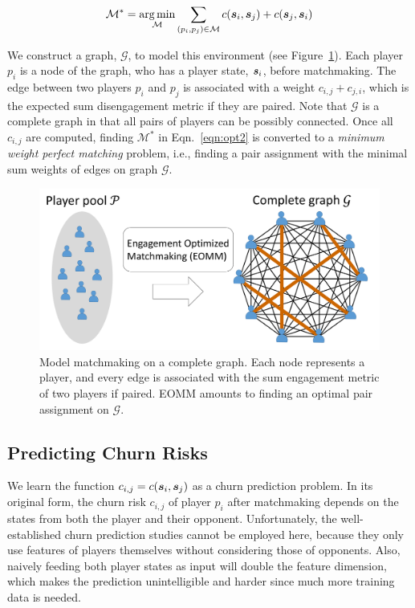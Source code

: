 \begin{align}
\mathcal{M}^* = \operatorname*{arg\,min}_{\mathcal{M}} \sum\limits_{(p_i, p_j)\in \mathcal{M}} c(\boldsymbol{s}_i, \boldsymbol{s}_j) + c(\boldsymbol{s}_j, \boldsymbol{s}_i) \label{eqn:opt2}
\end{align}


We construct a graph, $\mathcal{G}$, to model this environment (see Figure~\ref{fig:matching}). Each player $p_i$ is a node of the graph, who has a player state, $\boldsymbol{s}_i$, before matchmaking. The edge between two players $p_i$ and $p_j$ is associated with a weight $c_{i,j} + c_{j,i}$, which is the expected sum disengagement metric if they are paired. Note that $\mathcal{G}$ is a complete graph in that all pairs of players can be possibly connected. Once all $c_{i,j}$ are computed, finding $\mathcal{M}^*$ in Eqn.~\ref{eqn:opt2} is converted to a \emph{minimum weight perfect matching} problem, i.e., finding a pair assignment with the minimal sum weights of edges on graph $\mathcal{G}$.

\begin{figure}[tb]
\centering
\includegraphics[width=1\textwidth]{Figures/complete_matching.pdf}
\caption{Model matchmaking on a complete graph. Each node represents a player, and every edge is associated with the sum engagement metric of two players if paired. EOMM amounts to finding an optimal pair assignment on $\mathcal{G}$.}
\label{fig:matching}
\end{figure}


\subsection{Predicting Churn Risks}\label{sec:churn}
We learn the function $c_{i,j} = c(\boldsymbol{s}_i, \boldsymbol{s}_j)$ as a churn prediction problem. In its original form, the churn risk $c_{i,j}$ of player $p_i$ after matchmaking depends on the states from both the player and their opponent. Unfortunately, the well-established churn prediction studies cannot be employed here, because they only use features of players themselves without considering those of opponents. Also, naively feeding both player states as input will double the feature dimension, which makes the prediction unintelligible and harder since much more training data is needed. 

